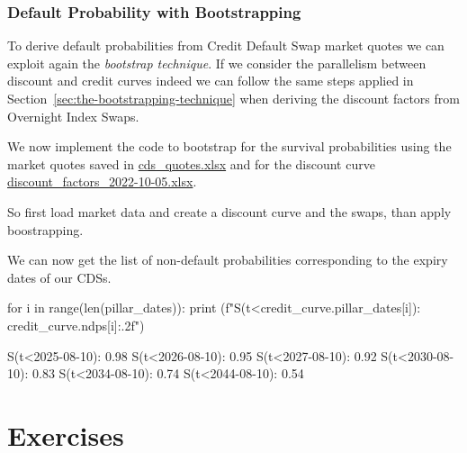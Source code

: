 \subsubsection*{Default Probability with Bootstrapping}
\label{default-probabilities-and-cds}

To derive default probabilities from Credit Default Swap market quotes we can exploit again the \emph{bootstrap technique}. 
If we consider the parallelism between discount and credit curves indeed we can follow the same steps applied in Section~\ref{sec:the-bootstrapping-technique} 
when deriving the discount factors from Overnight Index Swaps.


We now implement the code to bootstrap for the survival probabilities using the market quotes saved in 
\href{https://github.com/matteosan1/finance_course/raw/master/input_files/cds_quotes.xlsx}{cds\_quotes.xlsx} and for the discount curve 
\href{https://github.com/matteosan1/finance_course/raw/master/input_files/discount_factors_2022-10-05.xlsx}{discount\_factors\_2022-10-05.xlsx}.

So first load market data and create a discount curve and the swaps, than apply boostrapping.


We can now get the list of non-default probabilities corresponding to the expiry dates of our CDSs.

\begin{ipython}
for i in range(len(pillar_dates)):
    print (f"S(t<{credit_curve.pillar_dates[i]}): {credit_curve.ndps[i]:.2f}")
\end{ipython}
\begin{ioutput}
S(t<2025-08-10): 0.98
S(t<2026-08-10): 0.95
S(t<2027-08-10): 0.92
S(t<2030-08-10): 0.83
S(t<2034-08-10): 0.74
S(t<2044-08-10): 0.54
\end{ioutput}

\section*{Exercises}
%
